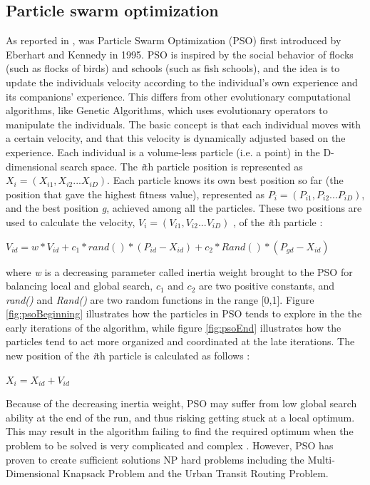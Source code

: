 \subsection{Particle swarm optimization}
\label{subsec:pso}
As reported in \citet{shi99}, was Particle Swarm Optimization (PSO) first introduced by Eberhart and Kennedy in 1995. PSO is inspired by the social behavior of flocks (such as flocks of birds) and schools (such as fish schools), and the idea is to update the individuals velocity according to the individual's own experience and its companions' experience. This differs from other evolutionary computational algorithms, like Genetic Algorithms, which uses evolutionary operators to manipulate the individuals. The basic concept is that each individual moves with a certain velocity, and that this velocity is dynamically adjusted based on the experience. Each individual is a volume-less particle (i.e. a point) in the D-dimensional search space. The \textit{i}th particle position is represented as $X_i = (X_{i1},X_{i2}...X_{iD})$. Each particle knows its own best position so far (the position that gave the highest fitness value), represented as $P_i = (P_{i1},P_{i2}...P_{iD})$, and the best position \textit{g}, achieved among all the particles. These two positions are used to calculate the velocity, $V_i = (V_{i1},V_{i2}...V_{iD})$ ,  of the \textit{i}th particle \citep{shi99}: 
\newline
\newline
\centerline{$V_{id} = w * V_{id} + c_1 * rand() * (P_{id}-X_{id}) + c_2 * Rand() * (P_{gd}-X_{id})$}
\newline
\newline
where \textit{w} is a decreasing parameter called inertia weight brought to the PSO for balancing local and global search, $c_1$ and $c_2$ are two positive constants, and \textit{rand()} and \textit{Rand()} are two random functions in the range [0,1]. Figure \ref{fig:psoBeginning} illustrates how the particles in PSO tends to explore in the the early iterations of the algorithm, while figure \ref{fig:psoEnd} illustrates how the particles tend to act more organized and coordinated at the late iterations. The new position of the \textit{i}th particle is calculated as follows \cite{shi99}:
\newline
\newline
\centerline{$X_i = X_{id} + V_{id}$}
\newline
\newline
Because of the decreasing inertia weight, PSO may suffer from low global search ability at the end of the run, and thus risking getting stuck at a local optimum. This may result in the algorithm failing to find the required optimum when the problem to be solved is very complicated and complex \cite{shi99}. However, PSO has proven to create sufficient solutions NP hard problems including the Multi-Dimensional Knapsack Problem\cite{wan09} and the Urban Transit Routing Problem\cite{kechagiopoulos14}. 

